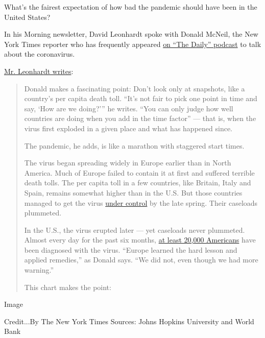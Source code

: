 What's the fairest expectation of how bad the pandemic should have been
in the United States?

In his Morning newsletter, David Leonhardt spoke with Donald McNeil, the
New York Times reporter who has frequently appeared
\href{https://www.nytimes3xbfgragh.onion/2020/08/25/podcasts/the-daily/coronavirus-plasma-reinfection.html}{on
``The Daily'' podcast} to talk about the coronavirus.

\href{https://www.nytimes3xbfgragh.onion/2020/09/11/briefing/california-wildfires-september-11-attacks-nfl-your-friday-briefing.html}{Mr.
Leonhardt writes}:

\begin{quote}
Donald makes a fascinating point: Don't look only at snapshots, like a
country's per capita death toll. ``It's not fair to pick one point in
time and say, `How are we doing?''' he writes. ``You can only judge how
well countries are doing when you add in the time factor'' --- that is,
when the virus first exploded in a given place and what has happened
since.

The pandemic, he adds, is like a marathon with staggered start times.

The virus began spreading widely in Europe earlier than in North
America. Much of Europe failed to contain it at first and suffered
terrible death tolls. The per capita toll in a few countries, like
Britain, Italy and Spain, remains somewhat higher than in the U.S. But
those countries managed to get the virus
\href{https://www.nytimes3xbfgragh.onion/2020/08/06/us/coronavirus-us.html}{under
control} by the late spring. Their caseloads plummeted.

In the U.S., the virus erupted later --- yet caseloads never plummeted.
Almost every day for the past six months,
\href{https://www.nytimes3xbfgragh.onion/interactive/2020/us/coronavirus-us-cases.html}{at
least 20,000 Americans} have been diagnosed with the virus. ``Europe
learned the hard lesson and applied remedies,'' as Donald says. ``We did
not, even though we had more warning.''

This chart makes the point:
\end{quote}

Image

Credit...By The New York Times \textbar{} Sources: Johns Hopkins
University and World Bank

